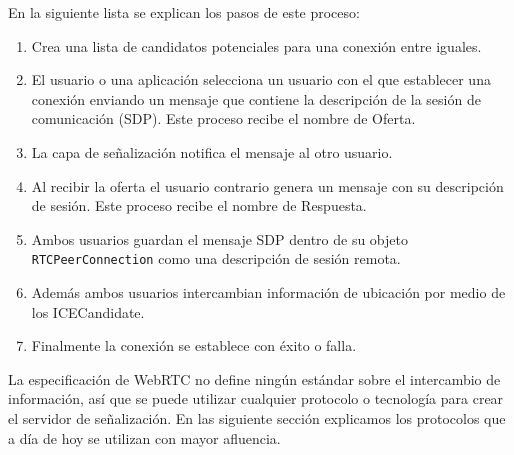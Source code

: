 En la siguiente lista se explican los pasos de este proceso:
\begin{enumerate}
\item Crea una lista de candidatos potenciales para una conexión entre iguales.
\item El usuario o una aplicación selecciona un usuario con el que establecer una conexión enviando un mensaje que contiene la descripción de la sesión de comunicación (SDP). Este proceso recibe el nombre de Oferta.
\item La capa de señalización notifica el mensaje al otro usuario.
\item Al recibir la oferta el usuario contrario genera un mensaje con su descripción de sesión. Este proceso recibe el nombre de Respuesta.
\item Ambos usuarios guardan el mensaje SDP dentro de su objeto \texttt{RTCPeerConnection} como una descripción de sesión remota.
\item Además ambos usuarios intercambian información de ubicación por medio de los ICECandidate.
\item Finalmente la conexión se establece con  éxito o falla.
\end{enumerate}
La especificación de WebRTC no define ningún estándar sobre el intercambio de información, así que se puede  utilizar cualquier protocolo o tecnología para crear el servidor de señalización. En las siguiente sección explicamos los protocolos que a día de hoy se utilizan con mayor afluencia.

